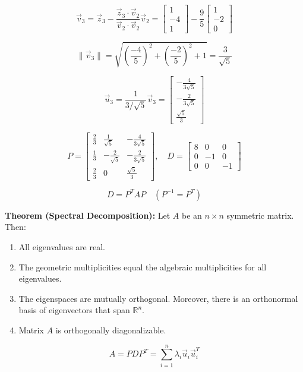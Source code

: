 \documentclass{article}
\begin{document}
\[
\vec{v}_3 = \vec{z}_3 - \frac{\vec{z}_3 \cdot \vec{v}_2}{\vec{v}_2 \cdot \vec{v}_2} \vec{v}_2 = \begin{bmatrix} 1 \\ -4 \\ 1 \end{bmatrix} - \frac{9}{5} \begin{bmatrix} 1 \\ -2 \\ 0 \end{bmatrix}
\]

\[
\|\vec{v}_3\| = \sqrt{\left(\frac{-4}{5}\right)^2 + \left(\frac{-2}{5}\right)^2 + 1} = \frac{3}{\sqrt{5}}
\]

\[
\vec{u}_3 = \frac{1}{3/\sqrt{5}} \vec{v}_3 = \begin{bmatrix} -\frac{4}{3\sqrt{5}} \\ -\frac{2}{3\sqrt{5}} \\ \frac{\sqrt{5}}{3} \end{bmatrix}
\]

\[
P = \begin{bmatrix} \frac{2}{3} & \frac{1}{\sqrt{5}} & -\frac{4}{3\sqrt{5}} \\ \frac{1}{3} & -\frac{2}{\sqrt{5}} & -\frac{2}{3\sqrt{5}} \\ \frac{2}{3} & 0 & \frac{\sqrt{5}}{3} \end{bmatrix}, \quad
D = \begin{bmatrix} 8 & 0 & 0 \\ 0 & -1 & 0 \\ 0 & 0 & -1 \end{bmatrix}
\]

\[
D = P^TAP \quad (P^{-1} = P^T)
\]

\textbf{Theorem (Spectral Decomposition):} Let $A$ be an $n \times n$ symmetric matrix. Then:
\begin{enumerate}
    \item All eigenvalues are real.
    \item The geometric multiplicities equal the algebraic multiplicities for all eigenvalues.
    \item The eigenspaces are mutually orthogonal. Moreover, there is an orthonormal basis of eigenvectors that span $\mathbb{R}^n$.
    \item Matrix $A$ is orthogonally diagonalizable.
\end{enumerate}

\[
A = PDP^T = \sum_{i=1}^n \lambda_i \vec{u}_i \vec{u}_i^T
\]
\end{document}
